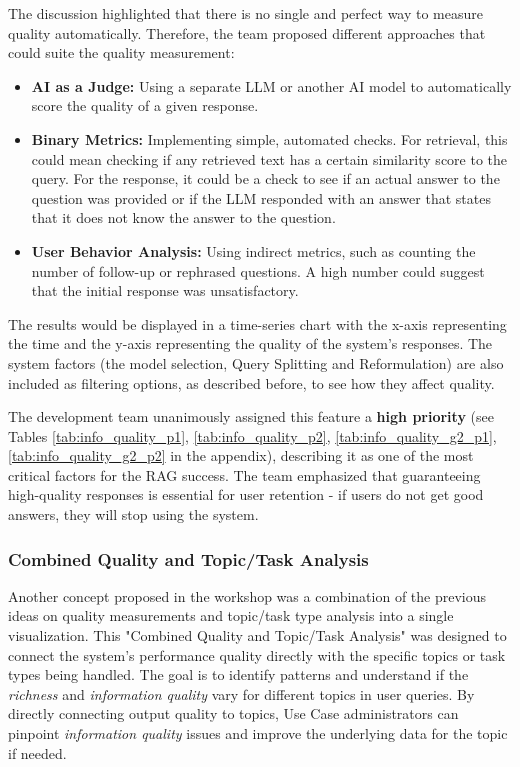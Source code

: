 \documentclass[
	english,
	ruledheaders=section,%
	class=report,%
	thesis={type=bachelor},%
	accentcolor=1b,%
	custommargins=true,%
	marginpar=false,%
	parskip=half-,%
	fontsize=11pt,%
	DIV=14,
]{tudapub}
\begin{document}
The discussion highlighted that there is no single and perfect way to measure quality automatically. Therefore, the team proposed different approaches that could suite the quality measurement:

\begin{itemize}
    \item \textbf{AI as a Judge:} Using a separate LLM or another AI model to automatically score the quality of a given response.
    \item \textbf{Binary Metrics:} Implementing simple, automated checks. For retrieval, this could mean checking if any retrieved text has a certain similarity score to the query. For the response, it could be a check to see if an actual answer to the question was provided or if the LLM responded with an answer that states that it does not know the answer to the question.
    \item \textbf{User Behavior Analysis:} Using indirect metrics, such as counting the number of follow-up or rephrased questions. A high number could suggest that the initial response was unsatisfactory.
\end{itemize}

The results would be displayed in a time-series chart with the x-axis representing the time and the y-axis representing the quality of the system's responses. The system factors (the model selection, Query Splitting and Reformulation) are also included as filtering options, as described before, to see how they affect quality.

The development team unanimously assigned this feature a \textbf{high priority} (see Tables \ref{tab:info_quality_p1}, \ref{tab:info_quality_p2}, \ref{tab:info_quality_g2_p1}, \ref{tab:info_quality_g2_p2} in the appendix), describing it as one of the most critical factors for the RAG success. The team emphasized that guaranteeing high-quality responses is essential for user retention - if users do not get good answers, they will stop using the system.
\subsubsection{Combined Quality and Topic/Task Analysis}
Another concept proposed in the workshop was a combination of the previous ideas on quality measurements and topic/task type analysis into a single visualization. This "Combined Quality and Topic/Task Analysis" was designed to connect the system's performance quality directly with the specific topics or task types being handled. The goal is to identify patterns and understand if the \textit{richness} and \textit{information quality} \parencite[pp.~57--58]{Jennex2006} vary for different topics in user queries. By directly connecting output quality to topics, Use Case administrators can pinpoint \textit{information quality} issues and improve the underlying data for the topic if needed.
\end{document}
